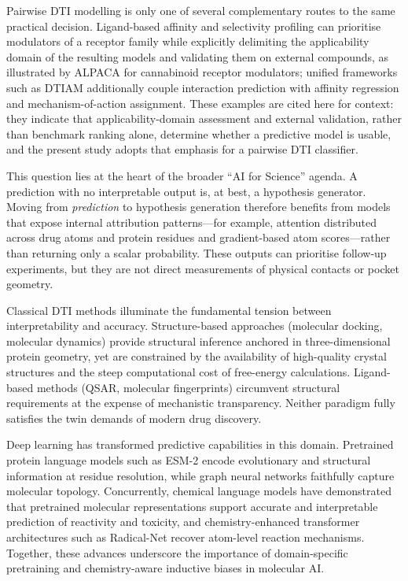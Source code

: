 \documentclass[fleqn,10pt]{wlscirep}
\begin{document}
Pairwise DTI modelling is only one of several complementary routes to the same
practical decision.  Ligand-based affinity and selectivity profiling can
prioritise modulators of a receptor family while explicitly delimiting the
applicability domain of the resulting models and validating them on external
compounds, as illustrated by ALPACA for cannabinoid receptor
modulators;\cite{delre2023alpaca} unified frameworks such as DTIAM additionally
couple interaction prediction with affinity regression and mechanism-of-action
assignment.\cite{lu2025dtiam}  These examples are cited here for context: they
indicate that applicability-domain assessment and external validation, rather
than benchmark ranking alone, determine whether a predictive model is usable,
and the present study adopts that emphasis for a pairwise DTI classifier.

This question lies at the heart of the broader ``AI for Science'' agenda.  A
prediction with no interpretable output is, at best, a hypothesis generator.
Moving from \emph{prediction} to hypothesis generation therefore benefits from
models that expose internal attribution patterns---for example, attention
distributed across drug atoms and protein residues and gradient-based atom
scores---rather than returning only a scalar probability.  These outputs can
prioritise follow-up experiments, but they are not direct measurements of
physical contacts or pocket geometry.

Classical DTI methods illuminate the fundamental tension between interpretability
and accuracy.  Structure-based approaches (molecular docking, molecular dynamics)
provide structural inference anchored in three-dimensional protein
geometry,\cite{kitchen2004docking} yet are constrained by the availability of
high-quality crystal structures and the steep computational cost of free-energy
calculations.  Ligand-based methods (QSAR, molecular
fingerprints)\cite{cherkasov2014qsar} circumvent structural requirements at
the expense of mechanistic transparency.  Neither paradigm fully satisfies the
twin demands of modern drug discovery.

Deep learning has transformed predictive capabilities in this domain.
Pretrained protein language models such as ESM-2\cite{lin2023evolutionary}
encode evolutionary and structural information at residue resolution, while
graph neural networks faithfully capture molecular topology.  Concurrently,
chemical language models have demonstrated that pretrained molecular
representations support accurate and interpretable prediction of reactivity and
toxicity,\cite{huang2025large} and chemistry-enhanced transformer
architectures such as Radical-Net recover atom-level reaction
mechanisms.\cite{huang2025radical}  Together, these advances underscore
the importance of domain-specific pretraining and chemistry-aware inductive
biases in molecular AI.\cite{huang2024ai}
\end{document}

